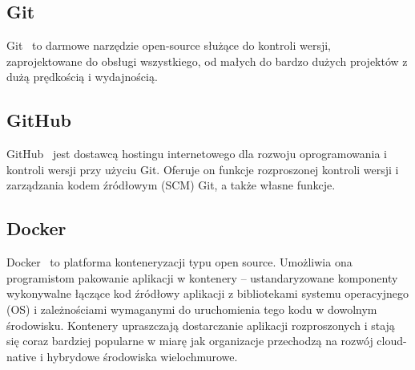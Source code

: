 	\subsection{Git}
	Git~\cite{git} to darmowe narzędzie open-source służące do kontroli wersji, zaprojektowane do obsługi wszystkiego, od małych do bardzo dużych projektów z dużą prędkością i wydajnością.	
	
	\subsection{GitHub}
	GitHub~\cite{github} jest dostawcą hostingu internetowego dla rozwoju oprogramowania i kontroli wersji przy użyciu Git. Oferuje on funkcje rozproszonej kontroli wersji i zarządzania kodem źródłowym (SCM) Git, a także własne funkcje.
	
	\subsection{Docker}
	Docker~\cite{docker} to platforma konteneryzacji typu open source. Umożliwia ona programistom pakowanie aplikacji w kontenery -- ustandaryzowane komponenty wykonywalne łączące kod źródłowy aplikacji z bibliotekami systemu operacyjnego (OS) i zależnościami wymaganymi do uruchomienia tego kodu w dowolnym środowisku. Kontenery upraszczają dostarczanie aplikacji rozproszonych i stają się coraz bardziej popularne w miarę jak organizacje przechodzą na rozwój cloud-native i hybrydowe środowiska wielochmurowe.
	
